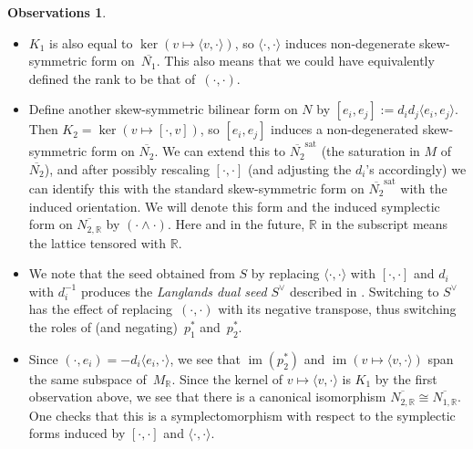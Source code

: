 \documentclass[11pt]{article}
\numberwithin{equation}{section}
\numberwithin{figure}{section}
\numberwithin{table}{section}
\DeclareMathOperator{\im}{im}
\DeclareMathOperator{\sat}{sat}
\let\?=\overline
\let\bb=\mathbb
\theoremstyle{definition}
\newtheorem{obss}[thm]{Observations}
\begin{document}
\begin{obss}\label{Cluster Obs}\quad
\begin{itemize}\itemsep=0pt
\item $K_1$ is also equal to $\ker (v\mapsto \langle v,\cdot\rangle )$, so $\langle \cdot,\cdot\rangle$ induces non-degenerate skew-symmetric form on~$\?{N_1}$. This also means that we could have equivalently defined the rank to be that of~$(\cdot,\cdot)$.
\item Define another skew-symmetric bilinear form on $N$ by $[e_i,e_j]:=d_id_j\langle e_i,e_j \rangle$. Then $K_2=\ker\left(v\mapsto [ \cdot,v ] \right)$, so $[e_i,e_j]$ induces a non-degenerated skew-symmetric form on $\?{N_2}$. We can extend this to $\?{N_2}^{\sat}$ (the saturation in $M$ of $\?{N_2}$), and after possibly rescaling $[\cdot,\cdot]$ (and adjusting the $d_i$'s accordingly) we can identify this with the standard skew-symmetric form on $\?{N_2}^{\sat}$ with the induced orientation. We will denote this form and the induced symplectic form on $\?{N_{2,\bb{R}}}$ by $(\cdot\wedge \cdot)$. Here and in the future, $\bb{R}$ in the subscript means the lattice tensored with $\bb{R}$.
\item We note that the seed obtained from $S$ by replacing $\langle \cdot,\cdot\rangle$ with $[\cdot,\cdot]$ and $d_i$ with $d_i^{-1}$ produces the {\it Langlands dual seed} $S^{\vee}$ described in \cite{FG1}.
 Switching to $S^{\vee}$ has the effect of replacing~$(\cdot,\cdot)$ with its negative transpose, thus switching the roles of (and negating)~$p_1^*$ and~$p_2^*$.
\item Since $(\cdot, e_i) = -d_i\langle e_i,\cdot\rangle$, we see that $\im(p^*_2)$ and $\im(v\mapsto \langle v,\cdot\rangle)$ span the same subspace of~$M_{\bb{R}}$. Since the kernel of $v\mapsto \langle v,\cdot\rangle$ is $K_1$ by the first observation above, we see that there is a canonical isomorphism $\?{N_{2,\bb{R}}}\cong \?{N_{1,\bb{R}}}$. One checks that this is a symplectomorphism with respect to the symplectic forms induced by $[\cdot,\cdot]$ and $\langle \cdot,\cdot\rangle$.
\end{itemize}
\end{obss}
\end{document}
